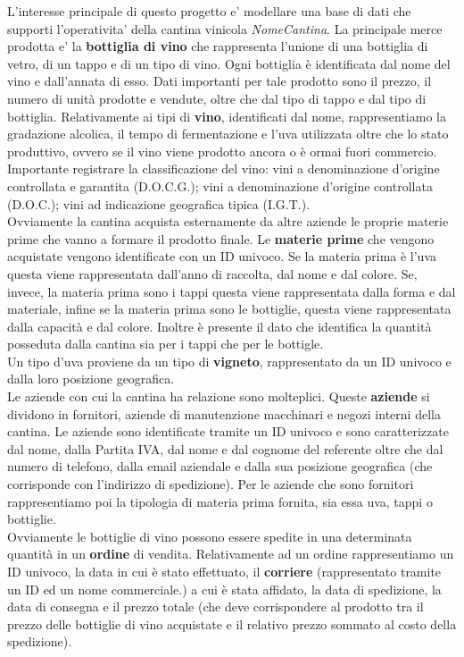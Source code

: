 L'interesse principale di questo progetto e' modellare una base di dati che supporti l'operativita' della cantina vinicola \emph{NomeCantina}. La principale merce prodotta e' la \textbf{bottiglia di vino} che rappresenta l'unione di una bottiglia di vetro, di un tappo e di un tipo di vino. Ogni bottiglia è identificata dal nome del vino e dall'annata di esso. Dati importanti per tale prodotto sono il prezzo, il numero di unità prodotte e vendute, oltre che dal tipo di tappo e dal tipo di bottiglia.
Relativamente ai tipi di \textbf{vino}, identificati dal nome, rappresentiamo la gradazione alcolica, il tempo di fermentazione e l'uva utilizzata oltre che lo stato produttivo, ovvero se il vino viene prodotto ancora o è ormai fuori commercio. Importante registrare la classificazione del vino: vini a denominazione d'origine controllata e garantita (D.O.C.G.); vini a denominazione d'origine controllata (D.O.C.); vini ad indicazione geografica tipica (I.G.T.).\\ Ovviamente la cantina acquista esternamente da altre aziende le proprie materie prime che vanno a formare il prodotto finale. Le \textbf{materie prime} che vengono acquistate vengono identificate con un ID univoco. Se la materia prima è l'uva questa viene rappresentata dall'anno di raccolta, dal nome e dal colore. Se, invece, la materia prima sono i tappi questa viene rappresentata dalla forma e dal materiale, infine se la materia prima sono le bottiglie, questa viene rappresentata dalla capacità e dal colore. Inoltre è presente il dato che identifica la quantità posseduta dalla cantina sia per i tappi che per le bottigle.\\
Un tipo d'uva proviene da un tipo di \textbf{vigneto}, rappresentato da un ID univoco e dalla loro posizione geografica. \\
Le aziende con cui la cantina ha relazione sono molteplici. Queste \textbf{aziende} si dividono in fornitori, aziende di manutenzione macchinari e negozi interni della cantina. Le aziende sono identificate tramite un ID univoco e sono caratterizzate dal nome, dalla Partita IVA, dal nome e dal cognome del referente oltre che dal numero di telefono, dalla email aziendale e dalla sua posizione geografica (che corrisponde con l'indirizzo di spedizione). Per le aziende che sono fornitori rappresentiamo poi la tipologia di materia prima fornita, sia essa uva, tappi o bottiglie.\\
Ovviamente le bottiglie di vino possono essere spedite in una determinata quantità in un \textbf{ordine} di vendita. Relativamente ad un ordine rappresentiamo un ID univoco, la data in cui è stato effettuato, il \textbf{corriere} (rappresentato tramite un ID ed un nome commerciale.) a cui è stata affidato, la data di spedizione, la data di consegna e il prezzo totale (che deve corrispondere al prodotto tra il prezzo delle bottiglie di vino acquistate e il relativo prezzo sommato al costo della spedizione).\\
